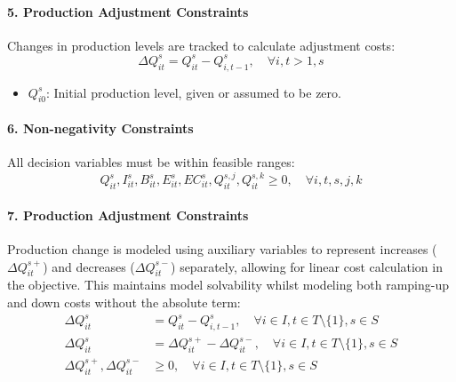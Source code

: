 \documentclass[final,3p,times,review,authoryear]{elsarticle}
\begin{document}
\paragraph{5. Production Adjustment Constraints}
Changes in production levels are tracked to calculate adjustment costs:
\begin{equation}
\label{eq:production_change}
\Delta Q_{it}^s = Q_{it}^s - Q_{i,t-1}^s, \quad \forall i, t > 1, s
\end{equation}
\begin{itemize}
\item $Q_{i0}^s$: Initial production level, given or assumed to be zero.
\end{itemize}

\paragraph{6. Non-negativity Constraints}
All decision variables must be within feasible ranges:
\begin{equation}
\label{eq:nonnegativity_constraint}
Q_{it}^s, I_{it}^s, B_{it}^s, E_{it}^s, EC_{it}^s, Q_{it}^{s,j}, Q_{it}^{s,k} \geq 0, \quad \forall i, t, s, j, k
\end{equation}

\paragraph{7. Production Adjustment Constraints}
Production change is modeled using auxiliary variables to represent increases ($\Delta Q_{it}^{s+}$) and decreases ($\Delta Q_{it}^{s-}$) separately, allowing for linear cost calculation in the objective. This maintains model solvability whilst modeling both ramping-up and down costs without the absolute term:
\begin{align}
\Delta Q_{it}^s &= Q_{it}^s - Q_{i,t-1}^s, \quad \forall i \in I, t \in T \setminus \{1\}, s \in S \\
\Delta Q_{it}^s &= \Delta Q_{it}^{s+} - \Delta Q_{it}^{s-}, \quad \forall i \in I, t \in T \setminus \{1\}, s \in S \\
\Delta Q_{it}^{s+}, \Delta Q_{it}^{s-} &\geq 0, \quad \forall i \in I, t \in T \setminus \{1\}, s \in S
\end{align}
\end{document}
